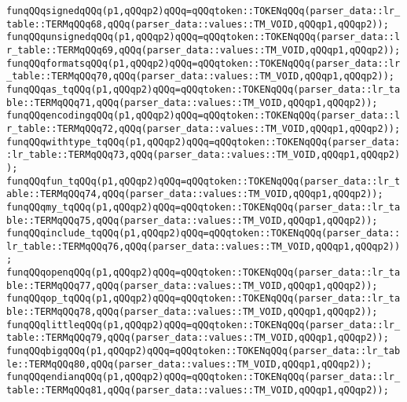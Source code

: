 \verb|funqQQqsignedqQQq(p1,qQQqp2)qQQq=qQQqtoken::TOKENqQQq(parser_data::lr_table::TERMqQQq68,qQQq(parser_data::values::TM_VOID,qQQqp1,qQQqp2));|\newline
\verb|funqQQqunsignedqQQq(p1,qQQqp2)qQQq=qQQqtoken::TOKENqQQq(parser_data::lr_table::TERMqQQq69,qQQq(parser_data::values::TM_VOID,qQQqp1,qQQqp2));|\newline
\verb|funqQQqformatsqQQq(p1,qQQqp2)qQQq=qQQqtoken::TOKENqQQq(parser_data::lr_table::TERMqQQq70,qQQq(parser_data::values::TM_VOID,qQQqp1,qQQqp2));|\newline
\verb|funqQQqas_tqQQq(p1,qQQqp2)qQQq=qQQqtoken::TOKENqQQq(parser_data::lr_table::TERMqQQq71,qQQq(parser_data::values::TM_VOID,qQQqp1,qQQqp2));|\newline
\verb|funqQQqencodingqQQq(p1,qQQqp2)qQQq=qQQqtoken::TOKENqQQq(parser_data::lr_table::TERMqQQq72,qQQq(parser_data::values::TM_VOID,qQQqp1,qQQqp2));|\newline
\verb|funqQQqwithtype_tqQQq(p1,qQQqp2)qQQq=qQQqtoken::TOKENqQQq(parser_data::lr_table::TERMqQQq73,qQQq(parser_data::values::TM_VOID,qQQqp1,qQQqp2));|\newline
\verb|funqQQqfun_tqQQq(p1,qQQqp2)qQQq=qQQqtoken::TOKENqQQq(parser_data::lr_table::TERMqQQq74,qQQq(parser_data::values::TM_VOID,qQQqp1,qQQqp2));|\newline
\verb|funqQQqmy_tqQQq(p1,qQQqp2)qQQq=qQQqtoken::TOKENqQQq(parser_data::lr_table::TERMqQQq75,qQQq(parser_data::values::TM_VOID,qQQqp1,qQQqp2));|\newline
\verb|funqQQqinclude_tqQQq(p1,qQQqp2)qQQq=qQQqtoken::TOKENqQQq(parser_data::lr_table::TERMqQQq76,qQQq(parser_data::values::TM_VOID,qQQqp1,qQQqp2));|\newline
\verb|funqQQqopenqQQq(p1,qQQqp2)qQQq=qQQqtoken::TOKENqQQq(parser_data::lr_table::TERMqQQq77,qQQq(parser_data::values::TM_VOID,qQQqp1,qQQqp2));|\newline
\verb|funqQQqop_tqQQq(p1,qQQqp2)qQQq=qQQqtoken::TOKENqQQq(parser_data::lr_table::TERMqQQq78,qQQq(parser_data::values::TM_VOID,qQQqp1,qQQqp2));|\newline
\verb|funqQQqlittleqQQq(p1,qQQqp2)qQQq=qQQqtoken::TOKENqQQq(parser_data::lr_table::TERMqQQq79,qQQq(parser_data::values::TM_VOID,qQQqp1,qQQqp2));|\newline
\verb|funqQQqbigqQQq(p1,qQQqp2)qQQq=qQQqtoken::TOKENqQQq(parser_data::lr_table::TERMqQQq80,qQQq(parser_data::values::TM_VOID,qQQqp1,qQQqp2));|\newline
\verb|funqQQqendianqQQq(p1,qQQqp2)qQQq=qQQqtoken::TOKENqQQq(parser_data::lr_table::TERMqQQq81,qQQq(parser_data::values::TM_VOID,qQQqp1,qQQqp2));|\newline
